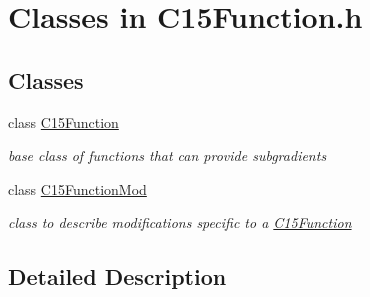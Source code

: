 \hypertarget{group___c15_function___c_l_a_s_s_e_s}{}\section{Classes in C15\+Function.\+h}
\label{group___c15_function___c_l_a_s_s_e_s}
\subsection*{Classes}
\begin{DoxyCompactItemize}
\item 
class \mbox{\hyperlink{class_s_m_spp__di__unipi__it_1_1_c15_function}{C15\+Function}}
\begin{DoxyCompactList}\small\item\em base class of functions that can provide subgradients \end{DoxyCompactList}\item 
class \mbox{\hyperlink{class_s_m_spp__di__unipi__it_1_1_c15_function_mod}{C15\+Function\+Mod}}
\begin{DoxyCompactList}\small\item\em class to describe modifications specific to a \mbox{\hyperlink{class_s_m_spp__di__unipi__it_1_1_c15_function}{C15\+Function}} \end{DoxyCompactList}\end{DoxyCompactItemize}


\subsection{Detailed Description}

